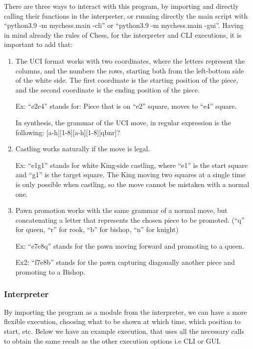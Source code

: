 \documentclass[10pt]{article}
\begin{document}
There are three ways to interact with this program, by importing and directly
calling their functions in the interpreter, or running directly the main script
with ``python3.9 -m mychess.main -cli'' or ``python3.9 -m mychess.main -gui''.
Having in mind already the rules of Chess, for the interpreter and CLI
executions, it is important to add that:
\begin{enumerate}[label=\alph*)]
\item The UCI format works with two coordinates, where the letters represent the
    columns, and the numbers the rows, starting both from the left-bottom side
    of the white side. The first coordinate is the starting position of the
    piece, and the second coordinate is the ending position of the piece.

    Ex: ``e2e4'' stands for: Piece that is on ``e2'' square, moves to ``e4''
    square.

    In synthesis, the grammar of the UCI move, in regular expression is the following: [a-h][1-8][a-h][1-8][qbnr]?


\item Castling works naturally if the move is legal. 

    Ex: ``e1g1'' stands for white King-side castling, where ``e1'' is the start square and
    ``g1'' is the target square. The King moving two squares at a single time is
    only possible when castling, so the move cannot be mistaken with a normal
    one. 
\item Pawn promotion works with the same grammar of a normal move, but
    concatenating a letter that represents the chosen piece to be promoted.
    (``q'' for queen, ``r'' for rook, ``b'' for bishop, ``n'' for knight)

    Ex: ``e7e8q'' stands for the pawn moving forward and promoting to a queen.

    Ex2: ``f7e8b'' stands for the pawn capturing diagonally another piece and
    promoting to a Bishop.

\end{enumerate}



\subsubsection{Interpreter}

By importing the program as a module from the interpreter, we can have a more flexible execution,
choosing what to be shown at which time, which position to start, etc. Below we have an example execution,
that uses all the necessary calls to obtain the same result as the other
execution options i.e CLI or GUI.
\end{document}
